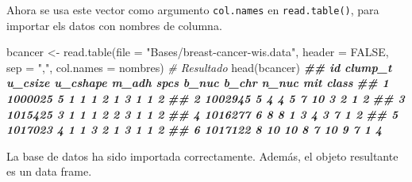 \documentclass[
]{book}
\newenvironment{Shaded}{\begin{snugshade}}{\end{snugshade}}
\newcommand{\AttributeTok}[1]{\textcolor[rgb]{0.77,0.63,0.00}{#1}}
\newcommand{\CommentTok}[1]{\textcolor[rgb]{0.56,0.35,0.01}{\textit{#1}}}
\newcommand{\ConstantTok}[1]{\textcolor[rgb]{0.00,0.00,0.00}{#1}}
\newcommand{\DocumentationTok}[1]{\textcolor[rgb]{0.56,0.35,0.01}{\textbf{\textit{#1}}}}
\newcommand{\FunctionTok}[1]{\textcolor[rgb]{0.00,0.00,0.00}{#1}}
\newcommand{\NormalTok}[1]{#1}
\newcommand{\OtherTok}[1]{\textcolor[rgb]{0.56,0.35,0.01}{#1}}
\newcommand{\StringTok}[1]{\textcolor[rgb]{0.31,0.60,0.02}{#1}}
\begin{document}
Ahora se usa este vector como argumento \texttt{col.names} en \texttt{read.table()}, para importar els datos con nombres de columna.

\begin{Shaded}
\begin{Highlighting}[]
\NormalTok{bcancer }\OtherTok{\textless{}{-}} \FunctionTok{read.table}\NormalTok{(}\AttributeTok{file =} \StringTok{"Bases/breast{-}cancer{-}wis.data"}\NormalTok{, }\AttributeTok{header =} \ConstantTok{FALSE}\NormalTok{, }\AttributeTok{sep =} \StringTok{","}\NormalTok{,}
                       \AttributeTok{col.names =}\NormalTok{ nombres)}
\CommentTok{\# Resultado}
\FunctionTok{head}\NormalTok{(bcancer)}
\DocumentationTok{\#\#        id clump\_t u\_csize u\_cshape m\_adh spcs b\_nuc b\_chr n\_nuc mit class}
\DocumentationTok{\#\# 1 1000025       5       1        1     1    2     1     3     1   1     2}
\DocumentationTok{\#\# 2 1002945       5       4        4     5    7    10     3     2   1     2}
\DocumentationTok{\#\# 3 1015425       3       1        1     1    2     2     3     1   1     2}
\DocumentationTok{\#\# 4 1016277       6       8        8     1    3     4     3     7   1     2}
\DocumentationTok{\#\# 5 1017023       4       1        1     3    2     1     3     1   1     2}
\DocumentationTok{\#\# 6 1017122       8      10       10     8    7    10     9     7   1     4}
\end{Highlighting}
\end{Shaded}

La base de datos ha sido importada correctamente. Además, el objeto resultante es un data frame.

\begin{Shaded}
\end{Shaded}
\end{document}
